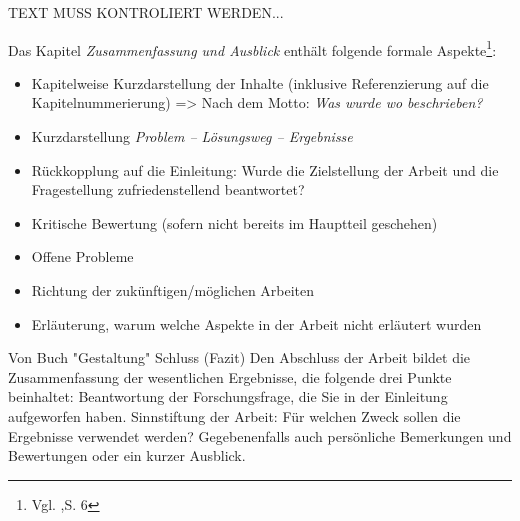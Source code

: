 TEXT MUSS KONTROLIERT WERDEN...\\

\newpage
\vspace{1cm}
\begin{tcolorbox}[title={Inhalte der \textit{Zusammenfassung und Ausblick}}]
  Das Kapitel \textit{Zusammenfassung und Ausblick} enthält folgende formale Aspekte\footnote{Vgl. \cite{BBoJ},S. 6}:
  \begin{itemize}
    \item Kapitelweise Kurzdarstellung der Inhalte (inklusive Referenzierung auf die Kapitelnummerierung) => Nach dem Motto: \textit{Was wurde wo beschrieben?}
    \item Kurzdarstellung \textit{Problem – Lösungsweg – Ergebnisse}
    \item Rückkopplung auf die Einleitung: Wurde die Zielstellung der Arbeit und die Fragestellung zufriedenstellend beantwortet?
    \item Kritische Bewertung (sofern nicht bereits im Hauptteil geschehen)
    \item Offene Probleme
    \item Richtung der zukünftigen/möglichen Arbeiten
    \item Erläuterung, warum welche Aspekte in der Arbeit nicht erläutert wurden
  \end{itemize}
Von Buch "Gestaltung"
  Schluss (Fazit)
Den Abschluss der Arbeit bildet die Zusammenfassung der wesentlichen
Ergebnisse, die folgende drei Punkte beinhaltet:
Beantwortung der Forschungsfrage, die Sie in der Einleitung
aufgeworfen haben.
Sinnstiftung der Arbeit: Für welchen Zweck sollen die Ergebnisse
verwendet werden?
Gegebenenfalls auch persönliche Bemerkungen und Bewertungen oder
ein kurzer Ausblick.
\end{tcolorbox}



